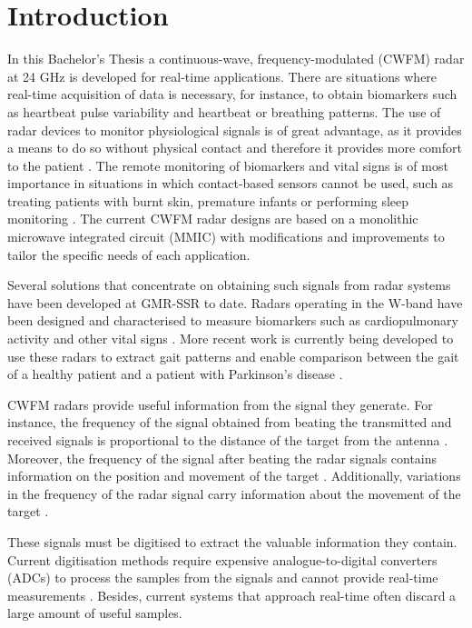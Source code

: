 \chapter{Introduction} \label{cha:intro}

	In this Bachelor's Thesis a continuous-wave, frequency-modulated (CWFM) radar at 24 GHz is developed for real-time applications. There are situations where real-time acquisition of data is necessary, for instance, to obtain biomarkers such as heartbeat pulse variability and heartbeat or breathing patterns. The use of radar devices to monitor physiological signals is of great advantage, as it provides a means to do so without physical contact and therefore it provides more comfort to the patient \cite{Saner2020}. The remote monitoring of biomarkers and vital signs is of most importance in situations in which contact-based sensors cannot be used, such as treating patients with burnt skin, premature infants or performing sleep monitoring \cite{BoricLubecke2016}.  The current CWFM radar designs are based on a monolithic microwave integrated circuit (MMIC) with modifications and improvements to tailor the specific needs of each application.

	Several solutions that concentrate on obtaining such signals from radar systems have been developed at GMR-SSR to date. Radars operating in the W-band have been designed and characterised to measure biomarkers such as cardiopulmonary activity \cite{Antolinos2020} and other vital signs \cite{Sardinero2022}. More recent work is currently being developed to use these radars to extract gait patterns \cite{Zhang2012} and enable comparison between the gait of a healthy patient and a patient with Parkinson's disease \cite{Sardinero2022}.

	CWFM radars provide useful information from the signal they generate. For instance, the frequency of the signal obtained from beating the transmitted and received signals is proportional to the distance of the target from the antenna \cite[p.~20-27]{Richards2010}. Moreover, the frequency of the signal after beating the radar signals contains information on the position and movement of the target \cite{Wang2014}. Additionally, variations in the frequency of the radar signal carry information about the movement of the target \cite{Kernec2019,Gurbuz2019}.

	These signals must be digitised to extract the valuable information they contain. Current digitisation methods require expensive analogue-to-digital converters (ADCs) to process the samples from the signals \cite[p.~7]{Antolinos2020} \cite[p.~26]{Sardinero2022} and cannot provide real-time measurements \cite[p.~38]{Sardinero2022}. Besides, current systems that approach real-time often discard a large amount of useful samples.


